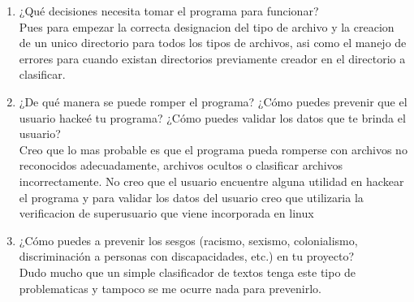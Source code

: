 \documentclass{article}
\begin{document}
\begin{enumerate}
\begin{enumerate}
      \item ¿Qué decisiones necesita tomar el programa para funcionar?\\
      Pues para empezar la correcta designacion del tipo de archivo y la creacion de un unico directorio para todos los tipos de archivos, asi como el manejo de errores para cuando existan directorios previamente creador en el directorio a clasificar.

      \item ¿De qué manera se puede romper el programa? ¿Cómo puedes prevenir que el usuario hackeé tu programa? ¿Cómo puedes validar los datos que te brinda el usuario?\\
      Creo que lo mas probable es que el programa pueda romperse con archivos no reconocidos adecuadamente, archivos ocultos o clasificar archivos incorrectamente. No creo que el usuario encuentre alguna utilidad en hackear el programa y para validar los datos del usuario creo que utilizaria la verificacion de superusuario que viene incorporada en linux

      \item ¿Cómo puedes a prevenir los sesgos (racismo, sexismo, colonialismo, discriminación a personas con discapacidades, etc.) en tu proyecto?\\
      Dudo mucho que un simple clasificador de textos tenga este tipo de problematicas y tampoco se me ocurre nada para prevenirlo.
    \end{enumerate}
\end{enumerate}
\end{document}
